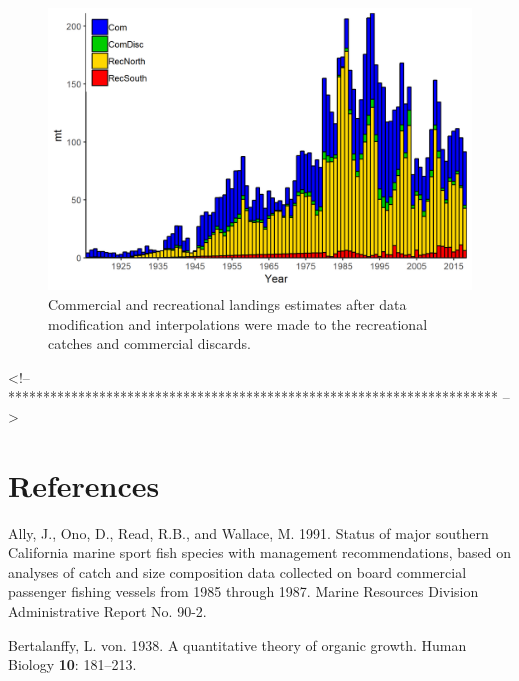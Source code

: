 \documentclass[12pt,]{article}
\begin{document}
\begin{figure}
\centering
\includegraphics{Figures/Catches_alternate.png}
\caption{Commercial and recreational landings estimates after data
modification and interpolations were made to the recreational catches
and commercial discards. \label{fig:Catches_alternate}}
\end{figure}

\FloatBarrier

\FloatBarrier

\FloatBarrier
<!-- ********************************************************************** -->

\FloatBarrier

\FloatBarrier

\FloatBarrier

\FloatBarrier

\newpage

\color{black}

\section*{References}\label{references}

\renewcommand{\thepage}{}

\hypertarget{refs}{}
\hypertarget{ref-Ally1991}{}
Ally, J., Ono, D., Read, R.B., and Wallace, M. 1991. Status of major
southern California marine sport fish species with management
recommendations, based on analyses of catch and size composition data
collected on board commercial passenger fishing vessels from 1985
through 1987. Marine Resources Division Administrative Report No. 90-2.

\hypertarget{ref-vonB1938}{}
Bertalanffy, L. von. 1938. A quantitative theory of organic growth.
Human Biology \textbf{10}: 181--213.
\end{document}
